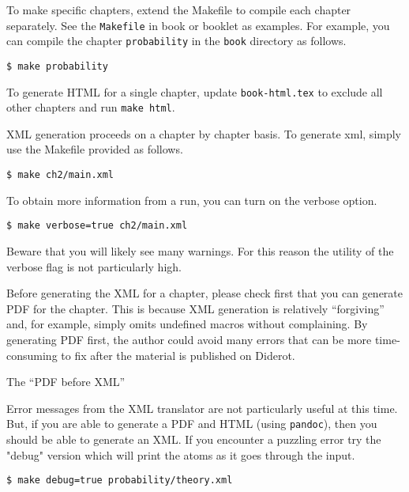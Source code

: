 \begin{note}
\begin{gram}
To make specific chapters,  extend the Makefile to compile each chapter separately.  See the \lstinline`Makefile` in book or booklet as examples.
%
For example, you can compile the chapter \lstinline`probability` in the \lstinline`book` directory as follows.
\begin{lstlisting}
$ make probability
\end{lstlisting}

To generate HTML for a single chapter, update \lstinline`book-html.tex` to exclude all other chapters and run \lstinline`make html`.

\end{gram}


\begin{gram}
XML generation proceeds on a chapter by chapter basis.
%
To generate xml, simply use the Makefile provided as follows.
%
\begin{lstlisting}
$ make ch2/main.xml
\end{lstlisting}
%

To obtain more information from a run, you can turn on the verbose option.
%
\begin{lstlisting}
$ make verbose=true ch2/main.xml
\end{lstlisting}

Beware that you will likely see many warnings.  For this reason the utility of the verbose flag is not particularly high.
\end{gram}

\begin{important}
Before generating the XML for a chapter, please check first that you can generate PDF for the chapter.  This is because XML generation is relatively ``forgiving'' and, for example, simply omits undefined macros without complaining.  By generating PDF first, the author could avoid many errors that can be more time-consuming to fix after the material is published on Diderot.
\end{important}

\begin{note}
The ``PDF before XML''
\end{note}

\begin{gram}
Error messages from the XML translator are not particularly useful at this time.  But, if you are able to generate a PDF and HTML (using \lstinline`pandoc`), then you should be able to generate an XML. 
%
If you encounter a puzzling error try the "debug" version which will print the atoms as it goes through the input.
%
\begin{lstlisting}
$ make debug=true probability/theory.xml
\end{lstlisting}


\end{gram}
\end{note}
